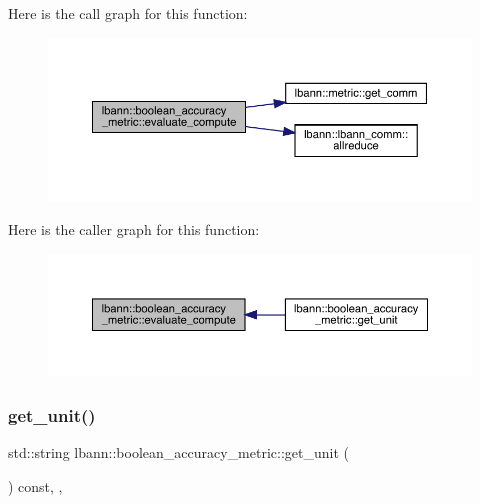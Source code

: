 Here is the call graph for this function\+:\nopagebreak
\begin{figure}[H]
\begin{center}
\leavevmode
\includegraphics[width=350pt]{classlbann_1_1boolean__accuracy__metric_acac2d198f516990fe9b87f3abefae635_cgraph}
\end{center}
\end{figure}
Here is the caller graph for this function\+:\nopagebreak
\begin{figure}[H]
\begin{center}
\leavevmode
\includegraphics[width=350pt]{classlbann_1_1boolean__accuracy__metric_acac2d198f516990fe9b87f3abefae635_icgraph}
\end{center}
\end{figure}
\mbox{\label{classlbann_1_1boolean__accuracy__metric_abde43253ef54b243f9faa1b1adea0672}} 
\subsubsection{\texorpdfstring{get\+\_\+unit()}{get\_unit()}}
{\footnotesize\ttfamily std\+::string lbann\+::boolean\+\_\+accuracy\+\_\+metric\+::get\+\_\+unit (\begin{DoxyParamCaption}{ }\end{DoxyParamCaption}) const\hspace{0.3cm}{\ttfamily [inline]}, {\ttfamily [override]}, {\ttfamily [virtual]}}

